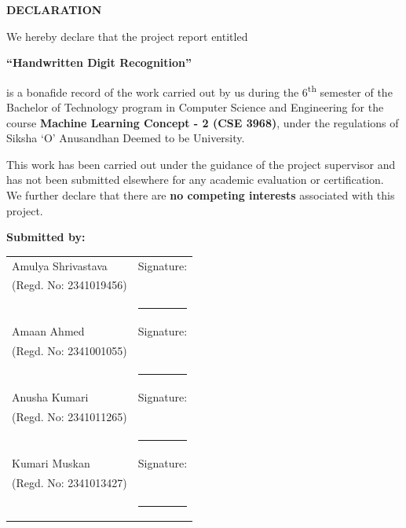 \documentclass[12pt,a4paper]{article}
\begin{document}
\newpage

\newpage
\newpage

\begin{center}

{\Large \textbf{DECLARATION}}\\[1cm]

\end{center}

\noindent
We hereby declare that the project report entitled


\begin{center}
\textbf{``Handwritten Digit Recognition''}
\end{center}

\noindent
is a bonafide record of the work carried out by us during the 6\textsuperscript{th} semester of the Bachelor of Technology program in Computer Science and Engineering for the course \textbf{Machine Learning Concept - 2 (CSE 3968)}, under the regulations of Siksha `O' Anusandhan Deemed to be University.

\vspace{0.5cm}

\noindent
This work has been carried out under the guidance of the project supervisor and has not been submitted elsewhere for any academic evaluation or certification. We further declare that there are \textbf{no competing interests} associated with this project.

\vspace{1cm}

\noindent
\textbf{Submitted by:}

\vspace{0.5cm}

\begin{tabular}{p{8cm} p{5cm}}

Amulya Shrivastava & Signature: \\
(Regd. No: 2341019456) & \\[-0.2cm]
& \rule{5cm}{0.4pt} \\[0.7cm]


Amaan Ahmed & Signature: \\
(Regd. No: 2341001055) & \\[-0.2cm]
& \rule{5cm}{0.4pt} \\[0.7cm]


Anusha Kumari & Signature: \\
(Regd. No: 2341011265) & \\[-0.2cm]
& \rule{5cm}{0.4pt} \\[0.7cm]


Kumari Muskan & Signature: \\
(Regd. No: 2341013427) & \\[-0.2cm]
& \rule{5cm}{0.4pt} \\[0.7cm]

\end{tabular}
\end{document}
